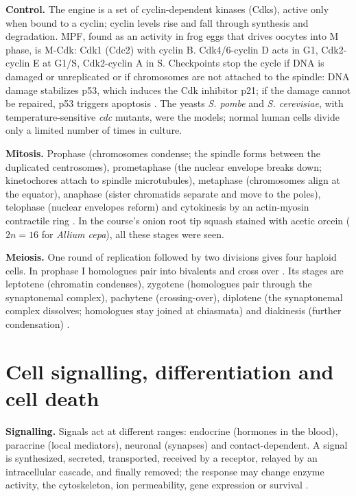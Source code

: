 \textbf{Control.}
The engine is a set of cyclin-dependent
kinases (Cdks), active only when bound to a
cyclin; cyclin levels rise and fall through
synthesis and degradation. MPF, found as an
activity in frog eggs that drives oocytes
into M phase, is M-Cdk: Cdk1 (Cdc2) with
cyclin B. Cdk4/6-cyclin D acts in G1,
Cdk2-cyclin E at G1/S, Cdk2-cyclin A in S.
Checkpoints stop the cycle if DNA is damaged
or unreplicated or if chromosomes are not
attached to the spindle: DNA damage
stabilizes p53, which induces the Cdk
inhibitor p21; if the damage cannot be
repaired, p53 triggers apoptosis
\cite[Chapter 18]{alberts2014essential}. The
yeasts \emph{S. pombe} and \emph{S.
cerevisiae}, with temperature-sensitive
\emph{cdc} mutants, were the models; normal
human cells divide only a limited number of
times in culture.

\textbf{Mitosis.}
Prophase (chromosomes condense; the spindle
forms between the duplicated centrosomes),
prometaphase (the nuclear envelope breaks
down; kinetochores attach to spindle
microtubules), metaphase (chromosomes align
at the equator), anaphase (sister chromatids
separate and move to the poles), telophase
(nuclear envelopes reform) and cytokinesis by
an actin-myosin contractile ring
\cite[Chapter 18]{alberts2014essential}. In
the course's onion root tip squash stained
with acetic orcein ($2n = 16$ for
\emph{Allium cepa}), all these stages were
seen.

\textbf{Meiosis.}
One round of replication followed by two
divisions gives four haploid cells. In
prophase I homologues pair into bivalents and
cross over \cite[Chapter
19]{alberts2014essential}. Its stages are
leptotene (chromatin condenses), zygotene
(homologues pair through the synaptonemal
complex), pachytene (crossing-over),
diplotene (the synaptonemal complex
dissolves; homologues stay joined at
chiasmata) and diakinesis (further
condensation) \cite[Chapter
3]{ross2011histology}.

\section{Cell signalling, differentiation and
cell death}
\label{section-mcb-signalling}

\textbf{Signalling.}
Signals act at different ranges: endocrine
(hormones in the blood), paracrine (local
mediators), neuronal (synapses) and
contact-dependent. A signal is synthesized,
secreted, transported, received by a
receptor, relayed by an intracellular
cascade, and finally removed; the response
may change enzyme activity, the cytoskeleton,
ion permeability, gene expression or survival
\cite[Chapter 16]{alberts2014essential}.


